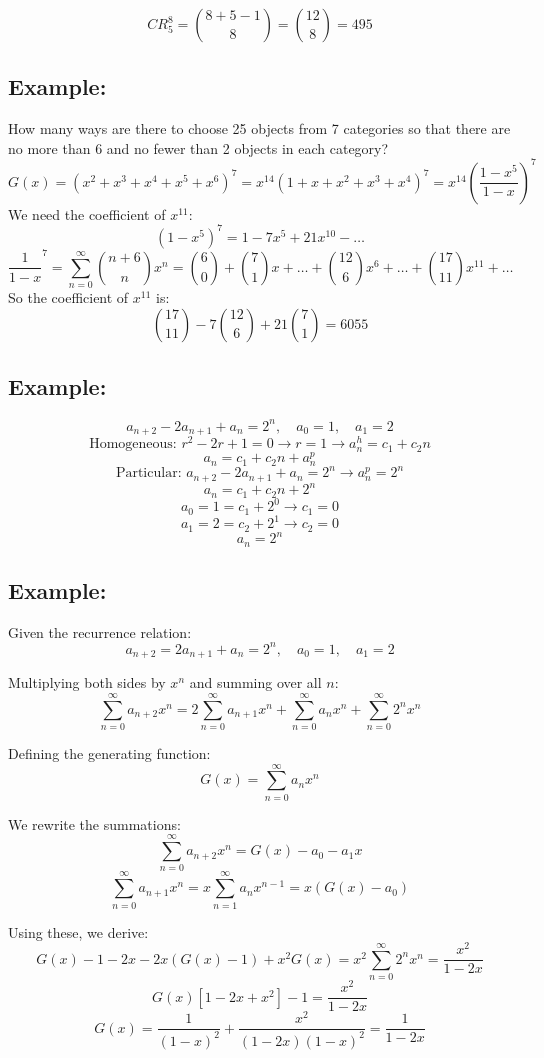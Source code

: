 \documentclass[11pt]{article}
\begin{document}
\[
CR_5^8 = \binom{8 + 5 - 1}{8} = \binom{12}{8} = 495
\]

\subsection*{Example:}
How many ways are there to choose 25 objects from 7 categories so that there are no more than 6 and no fewer than 2 objects in each category?
\[
G(x) = (x^2 + x^3 + x^4 + x^5 + x^6)^7 = x^{14} (1 + x + x^2 + x^3 + x^4)^7 = x^{14} \left( \frac{1 - x^5}{1 - x} \right)^7
\]
We need the coefficient of $x^{11}$:
\[
(1 - x^5)^7 = 1 - 7x^5 + 21x^{10} - \dots
\]
\[
\frac{1}{1 - x}^7 = \sum_{n = 0}^{\infty} \binom{n + 6}{n} x^n = \binom{6}{0} + \binom{7}{1}x + \dots + \binom{12}{6}x^6 + \dots + \binom{17}{11}x^{11} + \dots
\]
So the coefficient of $x^{11}$ is:
\[
\binom{17}{11} - 7 \binom{12}{6} + 21 \binom{7}{1} = 6055
\]

\subsection*{Example:}
\[
a_{n + 2} - 2a_{n + 1} + a_n = 2^n, \quad a_0 = 1, \quad a_1 = 2
\]
\[
\text{Homogeneous: } r^2 - 2r + 1 = 0 \rightarrow r = 1 \rightarrow a_n^h = c_1 + c_2 n
\]
\[
a_n = c_1 + c_2 n + a_n^p
\]
\[
\text{Particular: } a_{n + 2} - 2a_{n + 1} + a_n = 2^n \rightarrow a_n^p = 2^n
\]
\[
a_n = c_1 + c_2 n + 2^n
\]
\[
a_0 = 1 = c_1 + 2^0 \rightarrow c_1 = 0
\]
\[
a_1 = 2 = c_2 + 2^1 \rightarrow c_2 = 0
\]
\[
a_n = 2^n
\]

\subsection*{Example:}
Given the recurrence relation:
\[
a_{n+2} = 2a_{n+1} + a_n = 2^n, \quad a_0 = 1, \quad a_1 = 2
\]

Multiplying both sides by \( x^n \) and summing over all \( n \):
\[
\sum_{n=0}^{\infty} a_{n+2} x^n = 2 \sum_{n=0}^{\infty} a_{n+1} x^n + \sum_{n=0}^{\infty} a_n x^n + \sum_{n=0}^{\infty} 2^n x^n
\]

Defining the generating function:
\[
G(x) = \sum_{n=0}^{\infty} a_n x^n
\]

We rewrite the summations:
\[
\sum_{n=0}^{\infty} a_{n+2} x^n = G(x) - a_0 - a_1 x
\]
\[
\sum_{n=0}^{\infty} a_{n+1} x^n = x \sum_{n=1}^{\infty} a_n x^{n-1} = x(G(x) - a_0)
\]

Using these, we derive:
\[
G(x) - 1 - 2x - 2x(G(x) - 1) + x^2 G(x) = x^2 \sum_{n=0}^{\infty} 2^n x^n = \frac{x^2}{1-2x}
\]
\[
G(x) \left[1 - 2x + x^2 \right] - 1 = \frac{x^2}{1-2x}
\]
\[
G(x) = \frac{1}{(1-x)^2} + \frac{x^2}{(1-2x)(1-x)^2} = \frac{1}{1-2x}
\]
\end{document}
